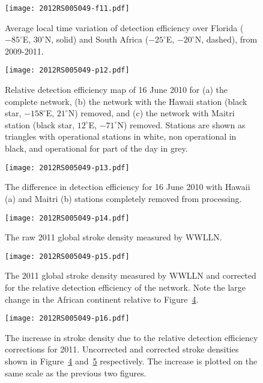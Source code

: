 \documentclass[draft,ras]{agutex}
\begin{document}
\begin{figure}[ht!]
   \centering
\noindent\texttt{[image: 2012RS005049-f11.pdf]} 
   \caption{Average local time variation of detection efficiency over Florida ($-85^\circ$E, $30^\circ$N, solid) and South Africa ($-25^\circ$E, $-20^\circ$N, dashed), from 2009-2011.}
   \label{deUTC}
\end{figure}

\begin{figure}[ht!]
   \centering
\noindent\texttt{[image: 2012RS005049-p12.pdf]} 
   \caption{Relative detection efficiency map of 16 June 2010  for (a) the complete network, (b) the network with the Hawaii station (black star, $-158^\circ$E, $21^\circ$N) removed, and (c) the network with Maitri station (black star, $12^\circ$E, $-71^\circ$N) removed. Stations are shown as triangles with operational stations in white, non operational in black, and operational for part of the day in grey.}
   \label{scrubMap}
\end{figure}

\begin{figure}[ht!]
   \centering
\noindent\texttt{[image: 2012RS005049-p13.pdf]}
\caption{The difference in detection efficiency for 16 June 2010 with Hawaii (a) and Maitri (b) stations completely removed from processing.}
\label{scrub}
\end{figure}

\begin{figure}[ht!]
   \centering
\noindent\texttt{[image: 2012RS005049-p14.pdf]} 
   \caption{The raw 2011 global stroke density measured by WWLLN.}
   \label{Global2011}
\end{figure}

\begin{figure}[ht!]
   \centering
\noindent\texttt{[image: 2012RS005049-p15.pdf]} 
   \caption{The 2011 global stroke density measured by WWLLN and corrected for the relative detection efficiency of the network. Note the large change in the African continent relative to Figure~\ref{Global2011}.}
   \label{Global2011Corrected}
\end{figure}

\begin{figure}[ht!]
   \centering
\noindent\texttt{[image: 2012RS005049-p16.pdf]} 
   \caption{The increase in stroke density due to the relative detection efficiency corrections for 2011. Uncorrected and corrected stroke densities shown in Figure~\ref{Global2011} and~\ref{Global2011Corrected} respectively. The increase is plotted on the same scale as the previous two figures.}
   \label{Global2011Diff}
\end{figure}
\end{document}
